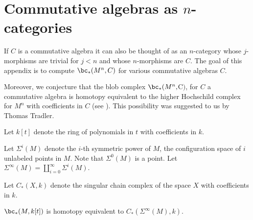 
\section{Commutative algebras as $n$-categories}
\label{sec:comm_alg}

If $C$ is a commutative algebra it
can also be thought of as an $n$-category whose $j$-morphisms are trivial for
$j<n$ and whose $n$-morphisms are $C$. 
The goal of this appendix is to compute
$\bc_*(M^n, C)$ for various commutative algebras $C$.

Moreover, we conjecture that the blob complex $\bc_*(M^n, $C$)$, for $C$ a commutative 
algebra is homotopy equivalent to the higher Hochschild complex for $M^n$ with 
coefficients in $C$ (see \cite{MR0339132, MR1755114, MR2383113}).  
This possibility was suggested to us by Thomas Tradler.


\medskip

Let $k[t]$ denote the ring of polynomials in $t$ with coefficients in $k$.

Let $\Sigma^i(M)$ denote the $i$-th symmetric power of $M$, the configuration space of $i$
unlabeled points in $M$.
Note that $\Sigma^0(M)$ is a point.
Let $\Sigma^\infty(M) = \coprod_{i=0}^\infty \Sigma^i(M)$.

Let $C_*(X, k)$ denote the singular chain complex of the space $X$ with coefficients in $k$.

\begin{prop} \label{sympowerprop}
$\bc_*(M, k[t])$ is homotopy equivalent to $C_*(\Sigma^\infty(M), k)$.
\end{prop}

